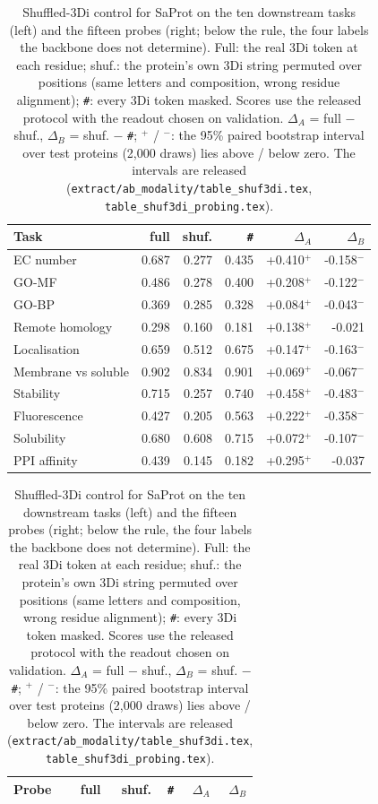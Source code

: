 \begin{table}[!htbp]
\centering
\scriptsize
\setlength{\tabcolsep}{3pt}
\caption{Shuffled-3Di control for SaProt on the ten downstream tasks (left) and the fifteen probes (right; below the rule, the four labels the backbone does not determine). Full: the real 3Di token at each residue; shuf.: the protein's own 3Di string permuted over positions (same letters and composition, wrong residue alignment); \texttt{\#}: every 3Di token masked. Scores use the released protocol with the readout chosen on validation. $\Delta_A$ = full $-$ shuf., $\Delta_B$ = shuf. $-$ \texttt{\#}; $^{+}$ / $^{-}$: the 95\% paired bootstrap interval over test proteins (2,000 draws) lies above / below zero. The intervals are released (\texttt{extract/ab\_modality/table\_shuf3di.tex}, \texttt{table\_shuf3di\_probing.tex}).}
\label{tab:saprot_shuffled_3di}
\label{tab:saprot_shuffled_3di_probing}
\begin{tabular}[t]{@{}lrrrrr@{}}
\toprule
Task & full & shuf. & \texttt{\#} & $\Delta_A$ & $\Delta_B$ \\
\midrule
EC number & 0.687 & 0.277 & 0.435 & +0.410$^{+}$ & -0.158$^{-}$ \\
GO-MF & 0.486 & 0.278 & 0.400 & +0.208$^{+}$ & -0.122$^{-}$ \\
GO-BP & 0.369 & 0.285 & 0.328 & +0.084$^{+}$ & -0.043$^{-}$ \\
Remote homology & 0.298 & 0.160 & 0.181 & +0.138$^{+}$ & -0.021\phantom{$^{+}$} \\
Localisation & 0.659 & 0.512 & 0.675 & +0.147$^{+}$ & -0.163$^{-}$ \\
Membrane vs soluble & 0.902 & 0.834 & 0.901 & +0.069$^{+}$ & -0.067$^{-}$ \\
Stability & 0.715 & 0.257 & 0.740 & +0.458$^{+}$ & -0.483$^{-}$ \\
Fluorescence & 0.427 & 0.205 & 0.563 & +0.222$^{+}$ & -0.358$^{-}$ \\
Solubility & 0.680 & 0.608 & 0.715 & +0.072$^{+}$ & -0.107$^{-}$ \\
PPI affinity & 0.439 & 0.145 & 0.182 & +0.295$^{+}$ & -0.037\phantom{$^{+}$} \\
\bottomrule
\end{tabular}
\hfill
\begin{tabular}[t]{@{}lrrrrr@{}}
\toprule
Probe & full & shuf. & \texttt{\#} & $\Delta_A$ & $\Delta_B$ \\
\midrule

\end{tabular}
\end{table}
